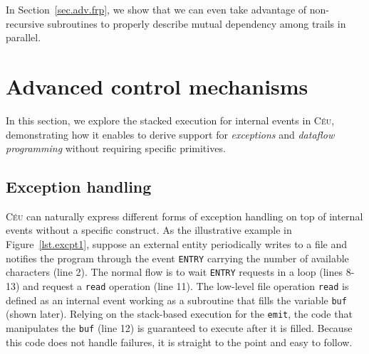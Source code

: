\documentclass{acm_proc_article-sp}
\newcommand{\CEU}{\textsc{C\'{e}u}\xspace}
\newcommand{\code}[1] {{\small{\texttt{#1}}}}
\newcommand{\DOFIN}{\code{do-finally}\xspace}
\newcommand{\1}{\;}
\newcommand{\2}{\;\;}
\newcommand{\3}{\;\;\;}
\newcommand{\5}{\;\;\;\;\;}
\begin{document}
\begin{comment}
Regardless of the limitations, this form of subroutines is widely adopted in 
\CEU programs, given that they were designed to work with the other control 
mechanisms.
Keep in mind that the typical reactive organization of programs (awaiting an 
external stimulus, reacting to it, and going back to awaiting) does not demand 
unrestricted subroutines.
\end{comment}
In Section~\ref{sec.adv.frp}, we show that we can even take advantage of 
non-recursive subroutines to properly describe mutual dependency among trails 
in parallel.

\section{Advanced control mechanisms}
\label{sec.adv}

In this section, we explore the stacked execution for internal events in \CEU, 
demonstrating how it enables to derive support for \emph{exceptions} and 
\emph{dataflow programming} without requiring specific primitives.

\begin{comment}
Although the described mechanisms involve thoughtful techniques, they can be 
easily abstracted with compile-time macros taking advantage of the structured 
style of \CEU%
\footnote{Our programs in \CEU make extensive use of the \emph{m4} 
preprocessor.}.
As an exception, the \DOFIN construct to be presented in 
Section~\ref{sec.adv.fin} makes slight global additions to the program tree and 
requires a dedicated syntax.
\end{comment}

\subsection{Exception handling}
\label{sec.adv.excpt}

\begin{comment}
Exception handling can be provided by specialized programming language 
constructs (e.g., \code{try-catch} blocks in Java), but also with techniques 
using standard control-flow primitives (e.g., \code{setjmp/longjmp} in $C$).
\end{comment}

\CEU can naturally express different forms of exception handling on top of 
internal events without a specific construct.
%
As the illustrative example in Figure~\ref{lst.excpt1}, suppose an external 
entity periodically writes to a file and notifies the program through the event 
\code{ENTRY} carrying the number of available characters (line 2).
The normal flow is to wait \code{ENTRY} requests in a loop (lines 8-13) and 
request a \code{read} operation (line 11).
The low-level file operation \code{read} is defined as an internal event
working as a subroutine that fills the variable \code{buf} (shown later).
Relying on the stack-based execution for the \code{emit}, the code that 
manipulates the \code{buf} (line 12) is guaranteed to execute after it is 
filled.
Because this code does not handle failures, it is straight to the point and 
easy to follow.
\end{document}
